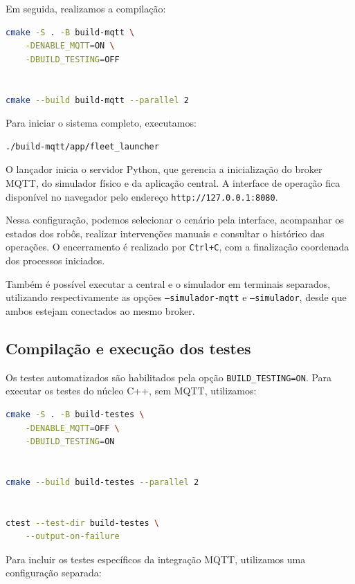 \documentclass[12pt,a4paper]{article}
\newcommand{\code}[1]{\mbox{\texttt{#1}}}
\begin{document}
Em seguida, realizamos a compilação:

\begin{lstlisting}[basicstyle=\ttfamily\footnotesize, language=bash]
cmake -S . -B build-mqtt \
    -DENABLE_MQTT=ON \
    -DBUILD_TESTING=OFF


cmake --build build-mqtt --parallel 2
\end{lstlisting}

Para iniciar o sistema completo, executamos:

\begin{lstlisting}[basicstyle=\ttfamily\footnotesize, language=bash]
./build-mqtt/app/fleet_launcher
\end{lstlisting}

O lançador inicia o servidor Python, que gerencia a inicialização do broker
MQTT, do simulador físico e da aplicação central. A interface de operação fica
disponível no navegador pelo endereço \code{http://127.0.0.1:8080}.

Nessa configuração, podemos selecionar o cenário pela interface, acompanhar os
estados dos robôs, realizar intervenções manuais e consultar o histórico das
operações. O encerramento é realizado por \code{Ctrl+C}, com a finalização
coordenada dos processos iniciados.

Também é possível executar a central e o simulador em terminais separados,
utilizando respectivamente as opções \code{--simulador-mqtt} e
\code{--simulador}, desde que ambos estejam conectados ao mesmo broker.


\subsection{Compilação e execução dos testes}

Os testes automatizados são habilitados pela opção \code{BUILD\_TESTING=ON}.
Para executar os testes do núcleo C++, sem MQTT, utilizamos:

\begin{lstlisting}[basicstyle=\ttfamily\footnotesize, language=bash]
cmake -S . -B build-testes \
    -DENABLE_MQTT=OFF \
    -DBUILD_TESTING=ON


cmake --build build-testes --parallel 2


ctest --test-dir build-testes \
    --output-on-failure
\end{lstlisting}

Para incluir os testes específicos da integração MQTT, utilizamos uma
configuração separada:
\end{document}
